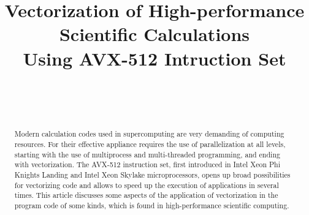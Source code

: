 \documentclass[
11pt,%
tightenlines,%
twoside,%
onecolumn,%
nofloats,%
nobibnotes,%
nofootinbib,%
superscriptaddress,%
noshowpacs,%
centertags]%
{revtex4}
\begin{document}

\title{Vectorization of High-performance Scientific Calculations\\
Using AVX-512 Intruction Set}

\author{~}

\author{~}



\begin{abstract}
Modern calculation codes used in supercomputing are very demanding of computing resources.
For their effective appliance requires the use of parallelization at all levels, starting with the use of multiprocess and multi-threaded programming, and ending with vectorization.
The AVX-512 instruction set, first introduced in Intel Xeon Phi Knights Landing and Intel Xeon Skylake microprocessors, opens up broad possibilities for vectorizing code and allows to speed up the execution of applications in several times.
This article discusses some aspects of the application of vectorization in the program code of some kinds, which is found in high-performance scientific computing.
\end{abstract}


\end{document}
